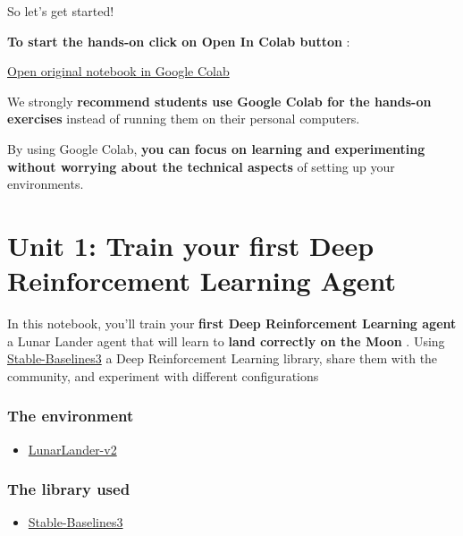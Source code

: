 \documentclass[11pt,a4paper]{article}
\begin{document}
So let's get started!

\textbf{To start the hands-on click on Open In Colab button} :

\href{https://colab.research.google.com/github/huggingface/deep-rl-class/blob/master/notebooks/unit1/unit1.ipynb}{Open original notebook in Google Colab}

We strongly \textbf{recommend students use Google Colab for the hands-on exercises} instead of running them on their personal computers.

By using Google Colab, \textbf{you can focus on learning and experimenting without worrying about the technical aspects} of setting up your environments.

\section{Unit 1: Train your first Deep Reinforcement Learning Agent}\label{unit-1-train-your-first-deep-reinforcement-learning-agent}


In this notebook, you'll train your \textbf{first Deep Reinforcement Learning agent} a Lunar Lander agent that will learn to \textbf{land correctly on the Moon }. Using \href{https://stable-baselines3.readthedocs.io/en/master/}{Stable-Baselines3} a Deep Reinforcement Learning library, share them with the community, and experiment with different configurations

\subsubsection{The environment}\label{the-environment}

\begin{itemize}
\tightlist
\item
  \href{https://gymnasium.farama.org/environments/box2d/lunar_lander/}{LunarLander-v2}
\end{itemize}

\subsubsection{The library used}\label{the-library-used}

\begin{itemize}
\tightlist
\item
  \href{https://stable-baselines3.readthedocs.io/en/master/}{Stable-Baselines3}
\end{itemize}
\end{document}
